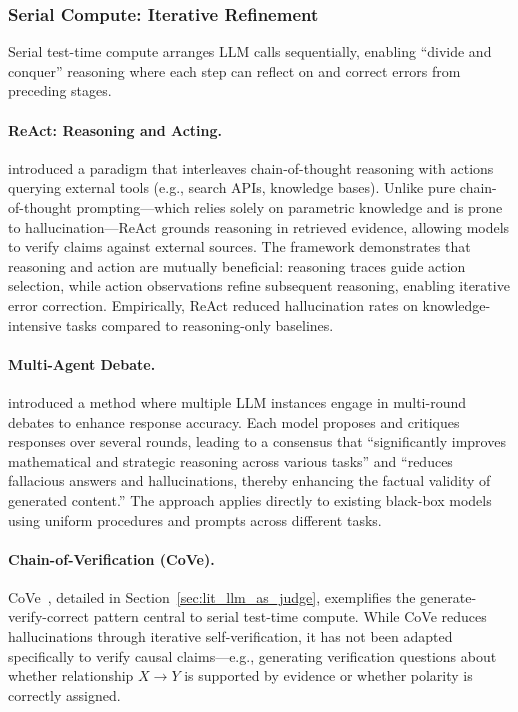 \subsubsection{Serial Compute: Iterative Refinement}

Serial test-time compute arranges LLM calls sequentially, enabling ``divide and conquer'' reasoning where each step can reflect on and correct errors from preceding stages.

\paragraph{ReAct: Reasoning and Acting.} \citet{yao2023react} introduced a paradigm that interleaves chain-of-thought reasoning with actions querying external tools (e.g., search APIs, knowledge bases). Unlike pure chain-of-thought prompting---which relies solely on parametric knowledge and is prone to hallucination---ReAct grounds reasoning in retrieved evidence, allowing models to verify claims against external sources. The framework demonstrates that reasoning and action are mutually beneficial: reasoning traces guide action selection, while action observations refine subsequent reasoning, enabling iterative error correction. Empirically, ReAct reduced hallucination rates on knowledge-intensive tasks compared to reasoning-only baselines.

\paragraph{Multi-Agent Debate.} \citet{du2023multiagentdebate} introduced a method where multiple LLM instances engage in multi-round debates to enhance response accuracy. Each model proposes and critiques responses over several rounds, leading to a consensus that ``significantly improves mathematical and strategic reasoning across various tasks'' and ``reduces fallacious answers and hallucinations, thereby enhancing the factual validity of generated content.'' The approach applies directly to existing black-box models using uniform procedures and prompts across different tasks.

\paragraph{Chain-of-Verification (CoVe).} CoVe~\citep{dhuliawala2024chain}, detailed in Section~\ref{sec:lit_llm_as_judge}, exemplifies the generate-verify-correct pattern central to serial test-time compute. While CoVe reduces hallucinations through iterative self-verification, it has not been adapted specifically to verify causal claims---e.g., generating verification questions about whether relationship $X \rightarrow Y$ is supported by evidence or whether polarity is correctly assigned.

